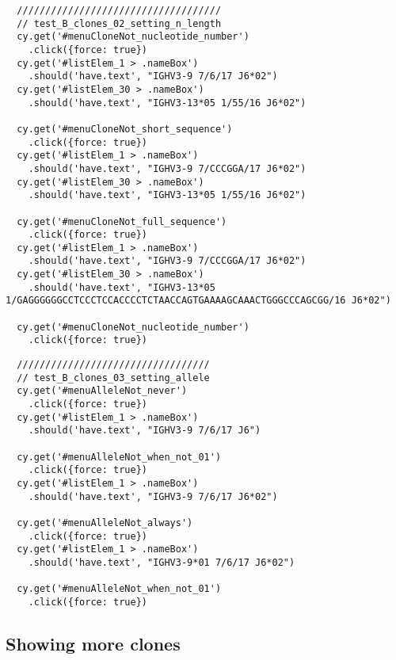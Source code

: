 \begin{verbatim}
  ////////////////////////////////////
  // test_B_clones_02_setting_n_length
  cy.get('#menuCloneNot_nucleotide_number')
    .click({force: true})
  cy.get('#listElem_1 > .nameBox')
    .should('have.text', "IGHV3-9 7/6/17 J6*02")
  cy.get('#listElem_30 > .nameBox')
    .should('have.text', "IGHV3-13*05 1/55/16 J6*02")

  cy.get('#menuCloneNot_short_sequence')
    .click({force: true})
  cy.get('#listElem_1 > .nameBox')
    .should('have.text', "IGHV3-9 7/CCCGGA/17 J6*02")
  cy.get('#listElem_30 > .nameBox')
    .should('have.text', "IGHV3-13*05 1/55/16 J6*02")

  cy.get('#menuCloneNot_full_sequence')
    .click({force: true})
  cy.get('#listElem_1 > .nameBox')
    .should('have.text', "IGHV3-9 7/CCCGGA/17 J6*02")
  cy.get('#listElem_30 > .nameBox')
    .should('have.text', "IGHV3-13*05 1/GAGGGGGGCCTCCCTCCACCCCTCTAACCAGTGAAAAGCAAACTGGGCCCAGCGG/16 J6*02")

  cy.get('#menuCloneNot_nucleotide_number')
    .click({force: true})

\end{verbatim}



\begin{verbatim}
  //////////////////////////////////
  // test_B_clones_03_setting_allele
  cy.get('#menuAlleleNot_never')
    .click({force: true})
  cy.get('#listElem_1 > .nameBox')
    .should('have.text', "IGHV3-9 7/6/17 J6")

  cy.get('#menuAlleleNot_when_not_01')
    .click({force: true})
  cy.get('#listElem_1 > .nameBox')
    .should('have.text', "IGHV3-9 7/6/17 J6*02")

  cy.get('#menuAlleleNot_always')
    .click({force: true})
  cy.get('#listElem_1 > .nameBox')
    .should('have.text', "IGHV3-9*01 7/6/17 J6*02")

  cy.get('#menuAlleleNot_when_not_01')
    .click({force: true})

\end{verbatim}

\subsection{Showing more clones}

